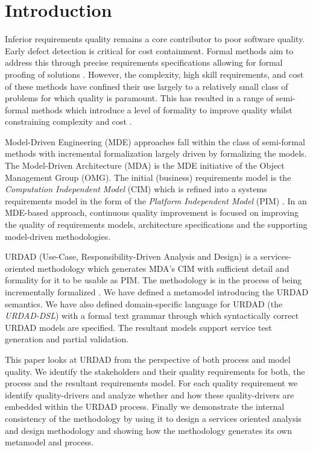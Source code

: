 \section{Introduction}
\label{sec:Introduction}

Inferior requirements quality remains a core contributor to poor software quality\cite{heck_experiences_2008}. Early defect detection is critical for cost containment\cite{biffl_software_2000}. Formal methods aim to address this through precise requirements specifications allowing for formal proofing of solutions \cite{hinchey_software_2008}. However, the complexity, high skill requirements, and cost of these methods have confined their use largely to a relatively small class of problems for which quality is paramount. This has resulted in a range of semi-formal methods which introduce a level of formality to improve quality whilst constraining complexity and cost \cite{razali_usability_2008}.

Model-Driven Engineering (MDE) \cite{frankel_model_2003} approaches fall within the class of semi-formal methods with incremental formalization largely driven by formalizing the models. The Model-Driven Architecture (MDA) is the MDE initiative of the Object Management Group (OMG). The initial (business) requirements model is the \emph{Computation Independent Model} (CIM) which is refined into a systems requirements model in the form of the \emph{Platform Independent Model} (PIM) \cite{_mda_2003}. In an MDE-based approach, continuous quality improvement is focused on improving the quality of requirements models, architecture specifications and the supporting model-driven methodologies.

URDAD (Use-Case, Responsibility-Driven Analysis and Design) \cite{solms_technology_2007} is a services-oriented methodology which generates MDA's CIM \cite{solms_generating_2009} with sufficient detail and formality for it to be usable as PIM. The methodology is in the process of being incrementally formalized \cite{solms_urdad_2010}. We have defined a metamodel introducing the URDAD semantics. We have also defined domain-specific language for URDAD (the \emph{URDAD-DSL}) with a formal text grammar through which syntactically correct URDAD models are specified. The resultant models support service test generation and partial validation.

This paper looks at URDAD from the perspective of both process and model quality. We identify the stakeholders and their quality requirements for both, the process and the resultant requirements model. For each quality requirement we identify quality-drivers and analyze whether and how these quality-drivers are embedded within the URDAD process. Finally we demonstrate the internal consistency of the methodology by using it to design a services oriented analysis and design methodology and showing how the methodology generates its own metamodel and process.
